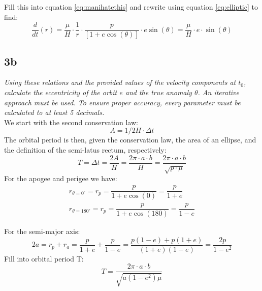 Fill this into equation \ref{eq:manihatethis} and rewrite using equation \ref{eq:elliptic} to find:
\begin{equation}
    \dfrac {d}{dt}\left( r\right) =\dfrac {\mu }{H}\cdot \dfrac {1}{r}\cdot \dfrac {p}{\left[ 1+e\cos \left( \theta \right) \right] }\cdot e\sin \left( \theta \right) = \dfrac {\mu }{H}\cdot e\cdot \sin \left( \theta \right) 
\end{equation}

\subsection{3b}
\textit{Using these relations and the provided values of the velocity components at $t_0$, calculate the eccentricity of the orbit $e$ and the true anomaly $\theta$. An iterative approach must be used. To ensure proper accuracy, every parameter must be calculated to at least 5 decimals.} \\

We start with the second conservation law:
\begin{equation}
    A = 1/2 H \cdot \Delta t
\end{equation}
The orbital period is then, given the conservation law, the area of an ellipse, and the definition of the semi-latus rectum, respectively:
\begin{equation}
    T = \Delta t = \frac{2 A }{H} = \frac{2\pi \cdot a \cdot b}{H} = \frac{2\pi \cdot a \cdot b}{\sqrt{p \cdot \mu}}
\end{equation}
For the apogee and perigee we have:
\begin{equation}
\begin{split}
    r_{\theta=0^\circ}=r_{p}=\dfrac {p}{1+e\cos \left( 0\right) }=\dfrac {p}{1+e} \\
    r_{\theta=180^\circ}=r_{p}=\dfrac {p}{1+e\cos \left( 180\right) }=\dfrac {p}{1-e}
\end{split}
\end{equation}

For the semi-major axis:
\begin{equation}
    2a=r_{p}+r_{a}=\dfrac {p}{1+e}+\dfrac {p}{1-e}=\dfrac {p\left( 1-e\right) +p\left( 1+e\right) }{\left( 1+e\right) \left( 1-e\right) } = \frac{2p}{1-e^2}
\end{equation}
Fill into orbital period T:
\begin{equation}
    T=\dfrac {2\pi \cdot a\cdot b}{\sqrt {a\left( 1-e^{2}\right) \mu }}
\end{equation}

